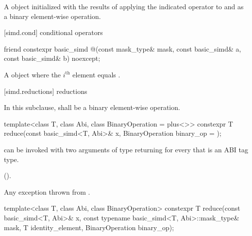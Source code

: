 \begin{itemdescr}
  \pnum\ConstraintOperatorTWellFormed

  \pnum\returns
  A  object initialized with the results of applying the indicated operator to  and  as a binary element-wise operation.
\end{itemdescr}

[simd.cond]{ conditional operators}

\begin{itemdecl}
friend constexpr basic_simd @\simdselect@(const mask_type& mask, const basic_simd& a, const basic_simd& b) noexcept;
\end{itemdecl}

\begin{itemdescr}
  \pnum\returns
  A  object where the $i^\text{th}$ element equals  \foralli.
\end{itemdescr}

[simd.reductions]{ reductions}

\pnum
In this subclause,  shall be a binary element-wise operation.

\begin{itemdecl}
template<class T, class Abi, class BinaryOperation = plus<>>
  constexpr T reduce(const basic_simd<T, Abi>& x, BinaryOperation binary_op = {});
\end{itemdecl}

\begin{itemdescr}
  \pnum\mandates
   can be invoked with two arguments of type  returning  for every  that is an ABI tag type.

  \pnum\returns
   \foralli ().

  \pnum\throws
  Any exception thrown from .
\end{itemdescr}

\begin{itemdecl}
template<class T, class Abi, class BinaryOperation>
  constexpr T reduce(const basic_simd<T, Abi>& x, const typename basic_simd<T, Abi>::mask_type& mask,
                     T identity_element, BinaryOperation binary_op);
\end{itemdecl}

